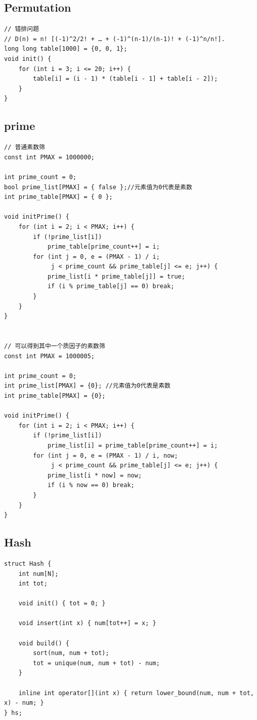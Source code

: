 \documentclass[twoside]{article}
\begin{document}
\subsection{Permutation}
\begin{lstlisting}
// 错排问题
// D(n) = n! [(-1)^2/2! + … + (-1)^(n-1)/(n-1)! + (-1)^n/n!].
long long table[1000] = {0, 0, 1};
void init() {
    for (int i = 3; i <= 20; i++) {
        table[i] = (i - 1) * (table[i - 1] + table[i - 2]);
    }
}\end{lstlisting}
\subsection{prime}
\begin{lstlisting}
// 普通素数筛
const int PMAX = 1000000;

int prime_count = 0;
bool prime_list[PMAX] = { false };//元素值为0代表是素数
int prime_table[PMAX] = { 0 };

void initPrime() {
    for (int i = 2; i < PMAX; i++) {
        if (!prime_list[i])
            prime_table[prime_count++] = i;
        for (int j = 0, e = (PMAX - 1) / i;
             j < prime_count && prime_table[j] <= e; j++) {
            prime_list[i * prime_table[j]] = true;
            if (i % prime_table[j] == 0) break;
        }
    }
}


// 可以得到其中一个质因子的素数筛
const int PMAX = 1000005;

int prime_count = 0;
int prime_list[PMAX] = {0}; //元素值为0代表是素数
int prime_table[PMAX] = {0};

void initPrime() {
    for (int i = 2; i < PMAX; i++) {
        if (!prime_list[i])
            prime_list[i] = prime_table[prime_count++] = i;
        for (int j = 0, e = (PMAX - 1) / i, now;
             j < prime_count && prime_table[j] <= e; j++) {
            prime_list[i * now] = now;
            if (i % now == 0) break;
        }
    }
}\end{lstlisting}
\subsection{Hash}
\begin{lstlisting}
struct Hash {
    int num[N];
    int tot;

    void init() { tot = 0; }

    void insert(int x) { num[tot++] = x; }

    void build() {
        sort(num, num + tot);
        tot = unique(num, num + tot) - num;
    }

    inline int operator[](int x) { return lower_bound(num, num + tot, x) - num; }
} hs;\end{lstlisting}
\end{document}
